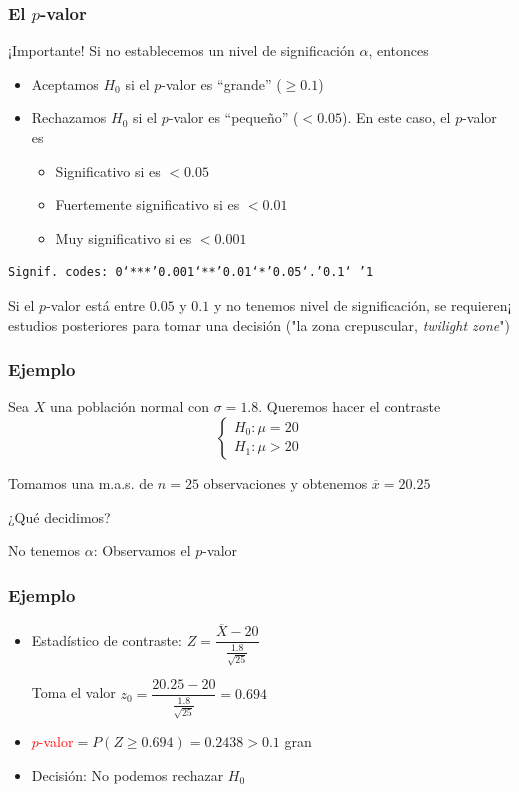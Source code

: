 \documentclass[12pt,t]{beamer}\usepackage[]{graphicx}\usepackage[]{color}
\newcommand{\red}[1]{\textcolor{red}{#1}}
\renewcommand{\emph}[1]{{\color{red}#1}}
\renewcommand{\geq}{\geqslant}
\theoremstyle{plain}
\theoremstyle{definition}
\begin{document}
\begin{frame}[fragile]
\frametitle{El $p$-valor}
\vspace*{-3ex}

\begin{block}{¡Importante!}
Si no establecemos un nivel   de significación   $\alpha$, entonces
\begin{itemize}
\item Aceptamos $H_0$ si el $p$-valor es ``grande'' ($\geq 0.1$)
\medskip

\item Rechazamos $H_0$ si el $p$-valor es ``pequeño'' ($<0.05$). En este caso, el $p$-valor es 
\begin{itemize}
\item \emph{Significativo} si es $< 0.05$
\item \emph{Fuertemente significativo} si es $<0.01$
\item \emph{Muy significativo} si es $<0.001$
\end{itemize}
\end{itemize}
\end{block}
{\small \begin{verbatim}
Signif. codes: 0‘***’0.001‘**’0.01‘*’0.05‘.’0.1‘ ’1 
\end{verbatim}
}\medskip

Si el $p$-valor está entre $0.05$ y $0.1$ y no tenemos nivel de significación, se requieren¡ estudios posteriores para tomar una decisión ("la \emph{zona crepuscular}, \textsl{twilight zone}")

\end{frame}


\begin{frame}
\frametitle{Ejemplo}
Sea $X$ una población normal con $\sigma=1.8$. Queremos hacer el contraste
$$
\left\{\begin{array}{l}
H_{0}:\mu=20\\ H_{1}:\mu>20
\end{array}
\right.
$$
\medskip

Tomamos una m.a.s. de $n=25$ observaciones y obtenemos  $\overline{x}=20.25$
\medskip

¿Qué decidimos?%

\medskip No tenemos $\alpha$: Observamos  el $p$-valor
\end{frame}


\begin{frame}
\frametitle{Ejemplo}

\begin{itemize}
\item \emph{Estadístico de contraste}: $Z=
\dfrac{\overline{X}-20}{\frac{1.8}{\sqrt{25}}}$
\medskip

Toma el valor $z_0=\dfrac{20.25-20}{\frac{1.8}{\sqrt{25}}}=0.694$

\item \red{$p$-valor}$=P(Z\geq 0.694)=0.2438>0.1$ gran

\item \emph{Decisión}:
No podemos rechazar   $H_{0}$
\end{itemize}

\end{frame}
\end{document}
